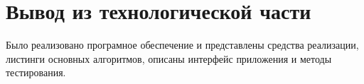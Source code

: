 \clearpage
\section*{Вывод из технологической части}
Было реализовано програмное обеспечение и представлены средства реализации, листинги основных алгоритмов, описаны интерфейс приложения и методы тестирования.
\clearpage
